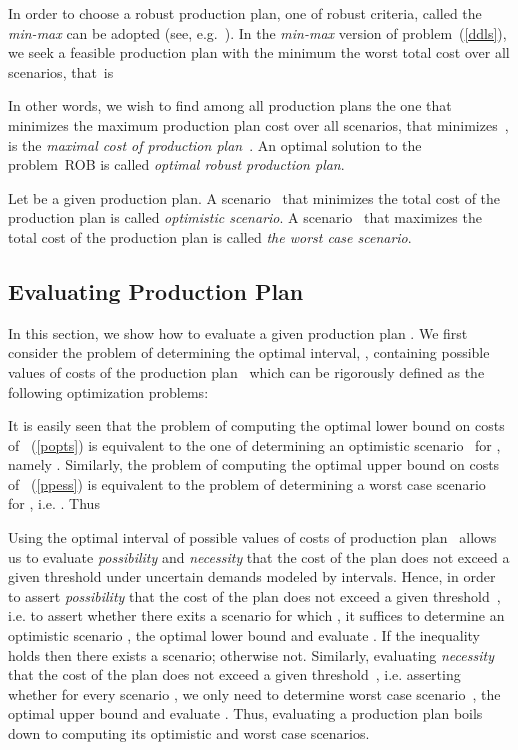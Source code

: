 \documentclass[11pt]{article}
\begin{document}
In order to choose a robust production plan,
one of robust criteria,
called the \emph{min-max} can be
adopted (see, e.g.~\cite{KY97}).
In the \emph{min-max} version of problem~(\ref{ddls}), we seek a 
feasible production plan with the minimum
the worst total cost
over all scenarios, that~is

In other words, we wish to find among all production plans the one that
minimizes the maximum production plan cost over all scenarios, 
that minimizes~,  is the \emph{maximal cost of production
plan}~. 
An optimal solution  to the problem~\textsc{ROB}
is called  \emph{optimal robust production plan}.
 
Let  be a given production plan.
A scenario~ that minimizes  the total cost  of 
the production plan 
is
called \emph{optimistic scenario}.
A scenario~ that maximizes the total cost 
  of the production plan
  is
called \emph{the
worst case scenario}.



\subsection{Evaluating  Production Plan}
\label{sepp}

In this section, we 
show how to evaluate a given production plan
. 
We first consider the problem of determining 
the optimal interval, 
,
containing possible values of costs of the production plan~
which can be rigorously defined as the following optimization problems:

It is easily seen that the problem of computing the optimal lower bound on costs 
of~ (\ref{popts}) is equivalent to 
the one of determining   an optimistic 
scenario~ for , namely 
.
Similarly, 
 the problem of computing the optimal upper bound on costs 
of~ (\ref{ppess}) is equivalent to 
the problem of determining   a worst case
scenario~ for , i.e.
. Thus


Using the optimal interval  of possible values of costs of
production plan~ 
allows us to evaluate  \emph{possibility} and \emph{necessity} that the cost of 
the plan does not exceed a given threshold under uncertain demands modeled by 
intervals. Hence,
in order to assert \emph{possibility}
 that the cost of 
the plan does not exceed a given threshold~, i.e. to assert whether there exits a scenario  for which ,
it suffices to determine an optimistic scenario , the optimal
lower bound  and
evaluate . If the inequality holds then there exists a scenario;
otherwise not. Similarly,  evaluating
 \emph{necessity} that the cost of 
the plan does not exceed a given threshold~,
i.e. asserting  whether  
for every scenario ,
we only need to determine worst 
case scenario~,
the optimal
upper bound 
and
evaluate . 
Thus, evaluating a production plan boils down to computing its optimistic and worst case
scenarios.
\end{document}
